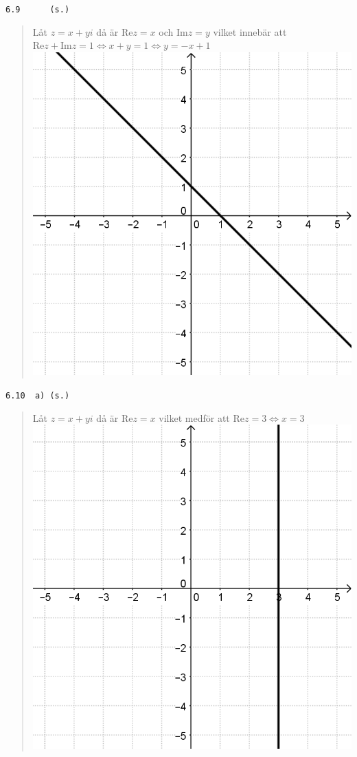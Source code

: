\documentclass[a4paper]{article}
\newcommand{\tskcol}[1]{\textcolor{tskcol}{#1}}
\begin{document}
	\texttt{\tskcol{6.9~~~~~ (s.)}}
	\begin{quotation}
		\noindent
		Låt $z=x+yi$ då är Re$z=x$ och Im$z=y$ vilket innebär att $\text{Re}z+\text{Im}z=1 \Leftrightarrow x+y=1 \Leftrightarrow y=-x+1$ \\
		\includegraphics[scale=0.2]{images/69.PNG}
	\end{quotation}
	
	\texttt{\tskcol{6.10~~a) (s.)}}
	\begin{quotation}
		\noindent
		Låt $z=x+yi$ då är Re$z=x$  vilket medför att Re$z=3 \Leftrightarrow x=3$ \\
		\includegraphics[scale=0.2]{images/610a.PNG}
	\end{quotation}
	
\end{document}
